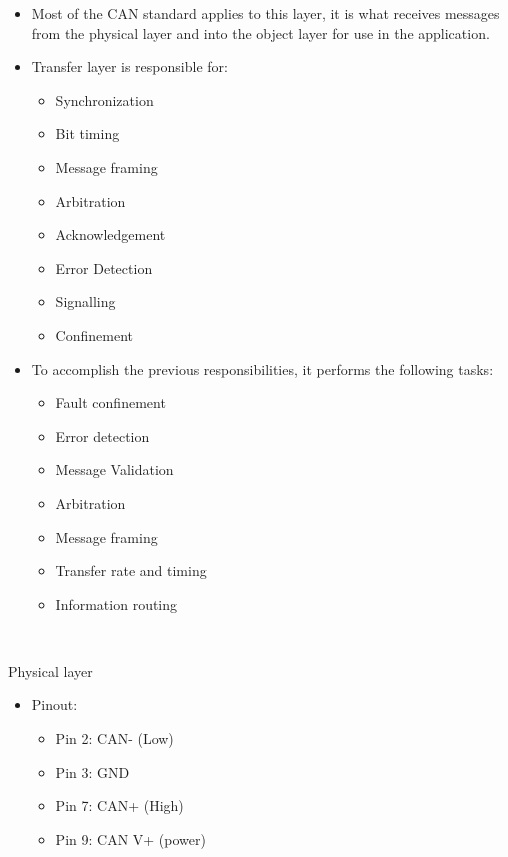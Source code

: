 \begin{itemize}
\item
  Most of the CAN standard applies to this layer, it is what receives
  messages from the physical layer and into the object layer for use in
  the application.
\item
  Transfer layer is responsible for:

  \begin{itemize}
  \item
    Synchronization
  \item
    Bit timing
  \item
    Message framing
  \item
    Arbitration
  \item
    Acknowledgement
  \item
    Error Detection
  \item
    Signalling
  \item
    Confinement
  \end{itemize}
\item
  To accomplish the previous responsibilities, it performs the following
  tasks:

  \begin{itemize}
  \item
    Fault confinement
  \item
    Error detection
  \item
    Message Validation
  \item
    Arbitration
  \item
    Message framing
  \item
    Transfer rate and timing
  \item
    Information routing
  \end{itemize}
\end{itemize}

~

Physical layer

\begin{itemize}
\item
  Pinout:

  \begin{itemize}
  \item
    Pin 2: CAN- (Low)
  \item
    Pin 3: GND
  \item
    Pin 7: CAN+ (High)
  \item
    Pin 9: CAN V+ (power)
  \end{itemize}
\end{itemize}

